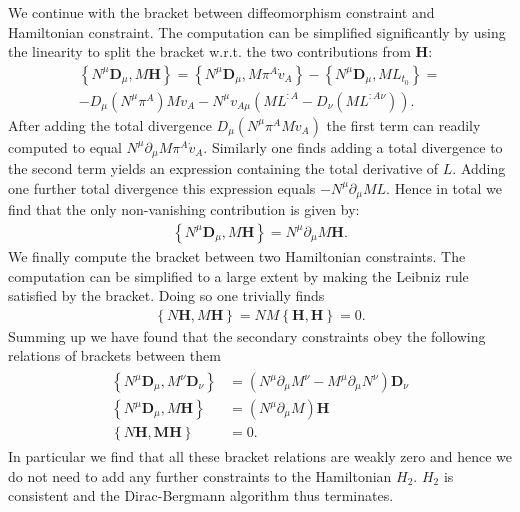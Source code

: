 \documentclass[a4paper,12pt, DIV=14, BCOR=5mm, twoside, headsepline, numbers=noenddot]{scrbook}
\begin{document}
We continue with the bracket between diffeomorphism constraint and Hamiltonian constraint. The computation can be simplified significantly by using the linearity to split the bracket w.r.t. the two contributions from $\mathbf{H}$: 
\begin{multline}
    \left \{ N^{\mu}\mathbf{D}_{\mu}, M \mathbf{H} \right \} = \left \{ N^\mu \mathbf{D}_\mu , M \pi^A \dot{v}_A   \right \} - \left \{ N^\mu \mathbf{D}_\mu , M L_{t_0}  \right \} = \\
    - D_\mu (N^\mu \pi^A) M \dot{v}_A - N^\mu v_{A\mu} (M L^{:A} - D_\nu (M L^{:A \nu}))  .
\end{multline}
After adding the total divergence $D_{\mu}(N^\mu \pi^A M \dot{v}_A)$ the first term can readily computed to equal $N^\mu \partial_\mu M \pi^A \dot{v}_A$. Similarly one finds adding a total divergence to the second term yields an expression containing the total derivative of $L$. Adding one further total divergence this expression equals $-N^\mu \partial _\mu M L$. Hence in total we find that the only non-vanishing contribution is given by:
\begin{align}
    \left \{ N^{\mu}\mathbf{D}_{\mu}, M \mathbf{H} \right \} = N^\mu \partial_\mu M \mathbf{H}.
\end{align}
We finally compute the bracket between two Hamiltonian constraints. The computation can be simplified to a large extent by making the Leibniz rule satisfied by the bracket. Doing so one trivially finds 
\begin{align}
    \left \{N \mathbf{H}, M \mathbf{H} \right \} = N M \left \{ \mathbf{H}, \mathbf{H}\right \} = 0.
\end{align}
Summing up we have found that the secondary constraints obey the following relations of brackets between them
\begin{align}
    \begin{aligned}
    \left \{N^\mu \mathbf{D}_\mu, M^\nu \mathbf{D}_\nu \right \} &= (N^\mu \partial_\mu M^\nu - M^\mu \partial _\mu N^\nu)\mathbf{D}_{\nu}\\
    \left \{ N^\mu \mathbf{D}_\mu , M \mathbf{H}\right \} &= (N^\mu \partial_\mu M) \mathbf{H}\\
    \left \{N \mathbf{H , M \mathbf{H}} \right \} &= 0.
    \end{aligned}
\end{align}
In particular we find that all these bracket relations are weakly zero and hence we do not need to add any further constraints to the Hamiltonian $H_2$. $H_2$ is consistent and the Dirac-Bergmann algorithm thus terminates. 
\end{document}
